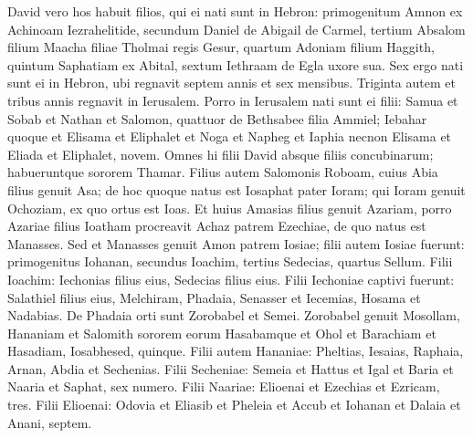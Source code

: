 \begin{biblechapter}  
\verse David vero hos habuit filios, qui ei nati sunt in Hebron: primogenitum Amnon ex Achinoam Iezrahelitide, secundum Daniel de Abigail de Carmel, 
\verse tertium Absalom filium Maacha filiae Tholmai regis Gesur, quartum Adoniam filium Haggith, 
\verse quintum Saphatiam ex Abital, sextum Iethraam de Egla uxore sua.  
\verse Sex ergo nati sunt ei in Hebron, ubi regnavit septem annis et sex mensibus. Triginta autem et tribus annis regnavit in Ierusalem. 
\verse Porro in Ierusalem nati sunt ei filii: Samua et Sobab et Nathan et Salomon, quattuor de Bethsabee filia Ammiel; 
\verse Iebahar quoque et Elisama et Eliphalet 
\verse et Noga et Napheg et Iaphia  
\verse necnon Elisama et Eliada et Eliphalet, novem. 
\verse Omnes hi filii David absque filiis concubinarum; habueruntque sororem Thamar. 
\verse Filius autem Salomonis Roboam, cuius Abia filius genuit Asa; de hoc quoque natus est Iosaphat 
\verse pater Ioram; qui Ioram genuit Ochoziam, ex quo ortus est Ioas. 
\verse Et huius Amasias filius genuit Azariam, porro Azariae filius Ioatham 
\verse procreavit Achaz patrem Ezechiae, de quo natus est Manasses.  
\verse Sed et Manasses genuit Amon patrem Iosiae; 
\verse filii autem Iosiae fuerunt: primogenitus Iohanan, secundus Ioachim, tertius Sedecias, quartus Sellum. 
\verse Filii Ioachim: Iechonias filius eius, Sedecias filius eius. 
\verse Filii Iechoniae captivi fuerunt: Salathiel filius eius, 
\verse Melchiram, Phadaia, Senasser et Iecemias, Hosama et Nadabias. 
\verse De Phadaia orti sunt Zorobabel et Semei. Zorobabel genuit Mosollam, Hananiam et Salomith sororem eorum 
\verse Hasabamque et Ohol et Barachiam et Hasadiam, Iosabhesed, quinque. 
\verse Filii autem Hananiae: Pheltias, Iesaias, Raphaia, Arnan, Abdia et Sechenias. 
\verse Filii Secheniae: Semeia et Hattus et Igal et Baria et Naaria et Saphat, sex numero. 
\verse Filii Naariae: Elioenai et Ezechias et Ezricam, tres. 
\verse Filii Elioenai: Odovia et Eliasib et Pheleia et Accub et Iohanan et Dalaia et Anani, septem. 
\end{biblechapter}

